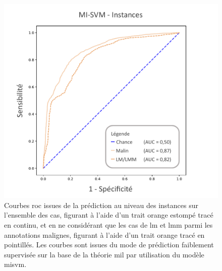 \begin{figure}[H]
    \centering
    \includegraphics[width=0.7\linewidth]{contents/chapter_7/resources/results_lesion_roc_instances.pdf}
    \caption{Courbes \gls{roc} issues de la prédiction au niveau des instances sur l'ensemble des cas, figurant à l'aide d'un trait orange estompé tracé en continu, et en ne considérant que les cas de \gls{lm} et \gls{lmm} parmi les annotations malignes, figurant à l'aide d'un trait orange tracé en pointillés. Les courbes sont issues  du mode de prédiction faiblement supervisée sur la base de la théorie \gls{mil} par utilisation du modèle \gls{misvm}.}
    \label{fig:results_lesion_roc_instances}
\end{figure}\par

